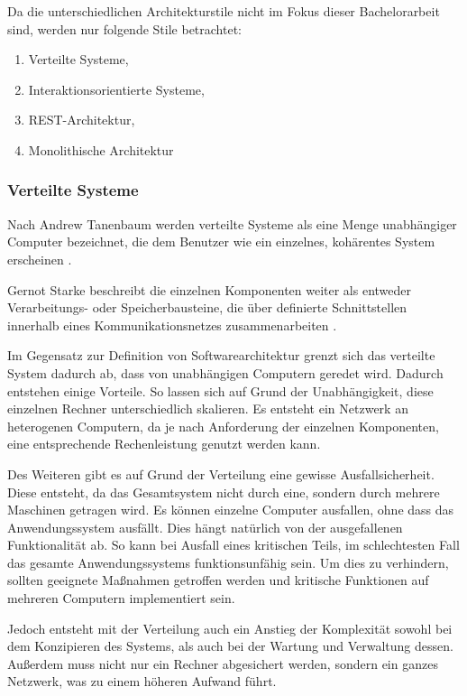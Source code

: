 Da die unterschiedlichen Architekturstile nicht im  Fokus dieser Bachelorarbeit sind, werden nur folgende Stile betrachtet:

\begin{enumerate}
	\item Verteilte Systeme,
	\item Interaktionsorientierte Systeme,
	\item REST-Architektur,
	\item Monolithische Architektur
\end{enumerate}


\subsubsection{Verteilte Systeme}
\label{sec:verteilte-systeme}

Nach Andrew Tanenbaum werden verteilte Systeme als eine Menge unabhängiger Computer bezeichnet, die dem Benutzer wie ein einzelnes, kohärentes System erscheinen \parencite{tanenbaum_verteilte_2007}.

Gernot Starke beschreibt die einzelnen Komponenten weiter als entweder Verarbeitungs- oder Speicherbausteine, die über definierte Schnittstellen innerhalb eines Kommunikationsnetzes zusammenarbeiten \parencite[vgl.][S. 116]{starke_effektive_2015}.

Im Gegensatz zur Definition von Softwarearchitektur grenzt sich das verteilte System dadurch ab, dass von unabhängigen Computern geredet wird. Dadurch entstehen einige Vorteile. So lassen sich auf Grund der Unabhängigkeit, diese einzelnen Rechner unterschiedlich skalieren. Es entsteht ein Netzwerk an heterogenen Computern, da je nach Anforderung der einzelnen Komponenten, eine entsprechende Rechenleistung genutzt werden kann.

Des Weiteren gibt es auf Grund der Verteilung eine gewisse Ausfallsicherheit. Diese entsteht, da das Gesamtsystem nicht durch eine, sondern durch mehrere Maschinen getragen wird. Es können einzelne Computer ausfallen, ohne dass das Anwendungssystem ausfällt. Dies hängt natürlich von der ausgefallenen Funktionalität ab. So kann bei Ausfall eines kritischen Teils,  im schlechtesten Fall das gesamte Anwendungssystems funktionsunfähig sein. Um dies zu verhindern, sollten geeignete Maßnahmen getroffen werden und kritische Funktionen auf mehreren Computern implementiert sein.

Jedoch entsteht mit der Verteilung auch ein Anstieg der Komplexität sowohl bei dem Konzipieren des Systems, als auch bei der Wartung und Verwaltung dessen. Außerdem muss nicht nur ein Rechner abgesichert werden, sondern ein ganzes Netzwerk, was zu einem höheren Aufwand führt.

